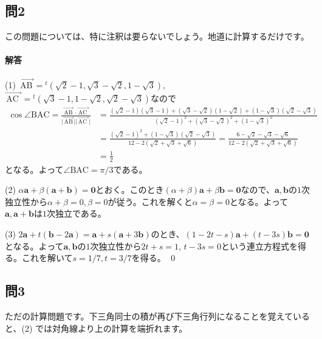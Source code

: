 \subsection{問2}

この問題については、特に注釈は要らないでしょう。地道に計算するだけです。

\paragraph{解答}

\noindent (1) 
$\overrightarrow{\mathrm{\,AB\,}} = {}^t(\sqrt{2} - 1 ,\sqrt{3} - \sqrt{2} ,1 - \sqrt{3})$, $\overrightarrow{\mathrm{\,AC\,\,}} = {}^t(\sqrt{3} - 1, 1 - \sqrt{2}, \sqrt{2} - \sqrt{3})$なので
\begin{align*}
\cos\angle\mathrm{BAC} = \frac{\overrightarrow{\mathrm{\,AB\,}}\cdot \overrightarrow{\mathrm{\,AC\,\,}}}{\bigl|\overrightarrow{\mathrm{\,AB\,}}\bigr|\bigl|\overrightarrow{\mathrm{\,AC\,\,}}\bigr|}
&= \frac{(\sqrt{2} - 1)(\sqrt{3} - 1) + (\sqrt{3} - \sqrt{2})(1 - \sqrt{2}) + (1 - \sqrt{3})(\sqrt{2} - \sqrt{3})}{(\sqrt{2} - 1)^2 + (\sqrt{3} - \sqrt{2})^2 + (1 - \sqrt{3})^2} \\
&= \frac{(\sqrt{2} - 1)^2 + (1 - \sqrt{3})(\sqrt{2} - \sqrt{3})}{12 - 2(\sqrt{2} + \sqrt{3} + \sqrt{6})}
= \frac{6 - \sqrt{2} - \sqrt{3} - \sqrt{6}}{12 - 2(\sqrt{2} + \sqrt{3} + \sqrt{6})} \\
&= \frac{1}{2}
\end{align*}
となる。よって$\angle\mathrm{BAC} = \pi/3$である。

\noindent (2) $\alpha \bm{a} + \beta (\bm{a} + \bm{b}) = \bm{0}$とおく。このとき$(\alpha + \beta)\bm{a} + \beta \bm{b} = \bm{0}$なので、$\bm{a}, \bm{b}$の$1$次独立性から$\alpha + \beta = 0, \beta = 0$が従う。これを解くと$\alpha = \beta = 0$となる。よって$\bm{a}, \bm{a} + \bm{b}$は$1$次独立である。

\noindent (3) $2\bm{a} + t(\bm{b} - 2\bm{a}) = \bm{a} + s(\bm{a} + 3\bm{b})$のとき、$(1 - 2t - s)\bm{a} + (t - 3s)\bm{b} = \bm{0}$となる。よって$\bm{a}, \bm{b}$の$1$次独立性から$2t + s = 1$, $t - 3s = 0$という連立方程式を得る。これを解いて$s = 1/7, t = 3/7$を得る。 \qed

\subsection{問3} ただの計算問題です。下三角同士の積が再び下三角行列になることを覚えていると、(2) では対角線より上の計算を端折れます。

